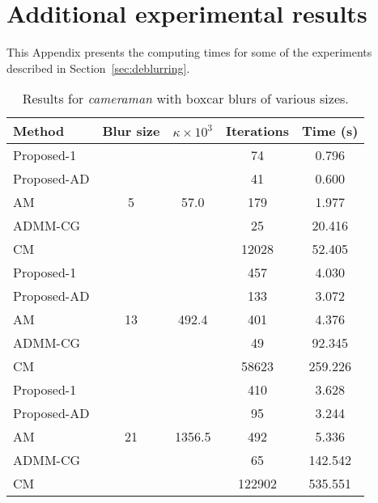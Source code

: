 \documentclass[10pt,twocolumn,twoside]{IEEEtran}
\begin{document}
\section{Additional experimental results}
\label{sec:app_exp}

This Appendix presents the computing times for some of the experiments described in \mbox{Section~\ref{sec:deblurring}}.

\begin{table}[h]
	\renewcommand{\arraystretch}{1}
	\caption{Results for \textit{cameraman} with boxcar blurs of various sizes.}
	\centering
\begin{tabular}{l|c|c|c|c}
Method &Blur size &$\kappa \times 10^3$ &Iterations &Time (s) \\
\hline
Proposed-1 & \multirow{5}{*}{5} & \multirow{5}{*}{57.0} &   74 & 0.796  \\ 
Proposed-AD & & &   41 & 0.600 \\ 
AM & & &  179 & 1.977 \\ 
ADMM-CG & & &   25 & 20.416 \\ 
CM & & & 12028 & 52.405 \\ 
\hline 
Proposed-1 & \multirow{5}{*}{13} & \multirow{5}{*}{492.4} &  457 & 4.030  \\ 
Proposed-AD & & &  133 & 3.072 \\ 
AM & & &  401 & 4.376 \\ 
ADMM-CG & & &   49 & 92.345 \\ 
CM & & & 58623 & 259.226 \\ 
\hline 
Proposed-1 & \multirow{5}{*}{21} & \multirow{5}{*}{1356.5} &  410 & 3.628  \\ 
Proposed-AD & & &   95 & 3.244 \\ 
AM & & &  492 & 5.336 \\ 
ADMM-CG & & &   65 & 142.542 \\ 
CM & & & 122902 & 535.551 \\ 
\hline 
\end{tabular}
\end{table}
\end{document}
